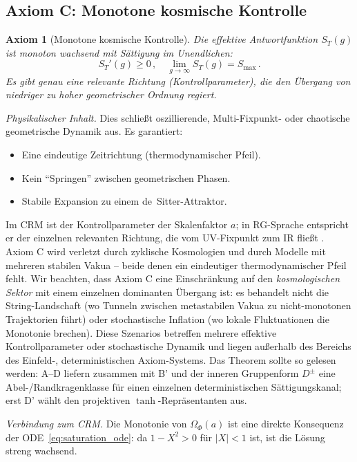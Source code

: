 \documentclass[aps,prd,twocolumn,superscriptaddress,nofootinbib]{revtex4-2}
\newtheorem{axiom}{Axiom}
\begin{document}
\subsection{Axiom C: Monotone kosmische Kontrolle}

\begin{axiom}[Monotone kosmische Kontrolle]
\label{ax:monotone}
Die effektive Antwortfunktion $S_T(g)$ ist monoton wachsend mit Sättigung im Unendlichen:
\begin{equation}
S_T'(g) \geq 0\,, \quad \lim_{g \to \infty} S_T(g) = S_{\max}\,.
\label{eq:monotone}
\end{equation}
Es gibt genau eine relevante Richtung (Kontrollparameter), die den Übergang von niedriger zu hoher geometrischer Ordnung regiert.
\end{axiom}

\textit{Physikalischer Inhalt.} Dies schließt oszillierende, Multi-Fixpunkt- oder chaotische geometrische Dynamik aus. Es garantiert:
\begin{itemize}
\item Eine eindeutige Zeitrichtung (thermodynamischer Pfeil).
\item Kein ``Springen'' zwischen geometrischen Phasen.
\item Stabile Expansion zu einem de~Sitter-Attraktor.
\end{itemize}

Im CRM ist der Kontrollparameter der Skalenfaktor $a$; in RG-Sprache entspricht er der einzelnen relevanten Richtung, die vom UV-Fixpunkt zum IR fließt \cite{Percacci2017}. Axiom C wird verletzt durch zyklische Kosmologien und durch Modelle mit mehreren stabilen Vakua -- beide denen ein eindeutiger thermodynamischer Pfeil fehlt. Wir beachten, dass Axiom C eine Einschränkung auf den \textit{kosmologischen Sektor} mit einem einzelnen dominanten Übergang ist: es behandelt nicht die String-Landschaft (wo Tunneln zwischen metastabilen Vakua zu nicht-monotonen Trajektorien führt) oder stochastische Inflation (wo lokale Fluktuationen die Monotonie brechen). Diese Szenarios betreffen mehrere effektive Kontrollparameter oder stochastische Dynamik und liegen außerhalb des Bereichs des Einfeld-, deterministischen Axiom-Systems. Das Theorem sollte so gelesen werden: A--D liefern zusammen mit B' und der inneren Gruppenform $D^\pm$ eine Abel-/Randkragenklasse für einen einzelnen deterministischen Sättigungskanal; erst D' wählt den projektiven $\tanh$-Repräsentanten aus.

\textit{Verbindung zum CRM.} Die Monotonie von $\Omega_\Phi(a)$ ist eine direkte Konsequenz der ODE~\eqref{eq:saturation_ode}: da $1 - X^2 > 0$ für $|X| < 1$ ist, ist die Lösung streng wachsend.
\end{document}
